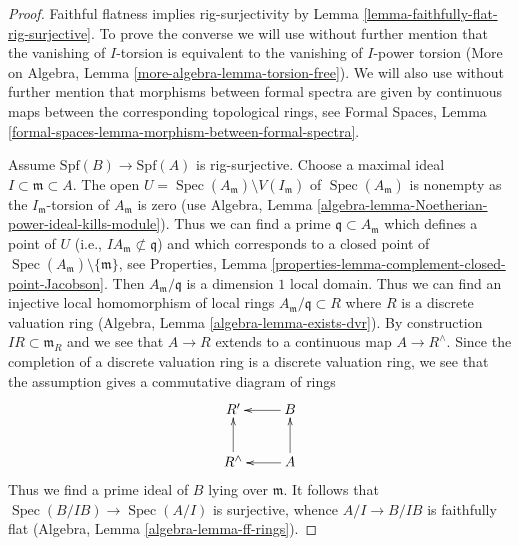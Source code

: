 \documentclass[10pt,a4paper]{amsart}
\theoremstyle{plain}
\theoremstyle{definition}
\theoremstyle{remark}
\numberwithin{equation}{subsection}
\def\Spec{\mathop{\mathrm{Spec}}}
\begin{document}
\begin{proof}
Faithful flatness implies rig-surjectivity by
Lemma \ref{lemma-faithfully-flat-rig-surjective}.
To prove the converse we will use without further mention that the
vanishing of $I$-torsion is equivalent to the vanishing of $I$-power torsion
(More on Algebra, Lemma \ref{more-algebra-lemma-torsion-free}).
We will also use without further mention that morphisms between
formal spectra are given by continuous maps between the corresponding
topological rings, see
Formal Spaces, Lemma \ref{formal-spaces-lemma-morphism-between-formal-spectra}.

\medskip\noindent
Assume $\text{Spf}(B) \to \text{Spf}(A)$ is rig-surjective.
Choose a maximal ideal $I \subset \mathfrak m \subset A$.
The open $U = \Spec(A_\mathfrak m) \setminus V(I_\mathfrak m)$
of $\Spec(A_\mathfrak m)$ is nonempty as the $I_\mathfrak m$-torsion of
$A_\mathfrak m$ is zero
(use Algebra, Lemma \ref{algebra-lemma-Noetherian-power-ideal-kills-module}).
Thus we can find a prime $\mathfrak q \subset A_\mathfrak m$ which defines
a point of $U$ (i.e., $IA_\mathfrak m \not \subset \mathfrak q$)
and which corresponds to a closed point
of $\Spec(A_\mathfrak m) \setminus \{\mathfrak m\}$, see
Properties, Lemma \ref{properties-lemma-complement-closed-point-Jacobson}.
Then $A_\mathfrak m/\mathfrak q$ is a dimension $1$ local domain.
Thus we can find an injective local homomorphism of local rings
$A_\mathfrak m/\mathfrak q \subset R$ where $R$ is a discrete valuation ring
(Algebra, Lemma \ref{algebra-lemma-exists-dvr}).
By construction $IR \subset \mathfrak m_R$ and we see that
$A \to R$ extends to a continuous map $A \to R^\wedge$.
Since the completion of a discrete valuation ring is a discrete
valuation ring, we see that the assumption gives a commutative
diagram of rings
$$
\xymatrix{
R' & B \ar[l] \\
R^\wedge \ar[u] & A \ar[l] \ar[u]
}
$$
Thus we find a prime ideal of $B$ lying over $\mathfrak m$. It follows
that $\Spec(B/IB) \to \Spec(A/I)$ is surjective, whence $A/I \to B/IB$
is faithfully flat
(Algebra, Lemma \ref{algebra-lemma-ff-rings}).
\end{proof}
\end{document}

